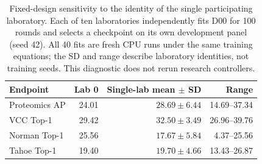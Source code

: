 \begin{table}[t]
\centering
\small
\caption{Fixed-design sensitivity to the identity of the single participating laboratory. Each of ten laboratories independently fits D00 for 100 rounds and selects a checkpoint on its own development panel (seed 42). All 40 fits are fresh CPU runs under the same training equations; the SD and range describe laboratory identities, not training seeds. This diagnostic does not rerun research controllers.}
\label{tab:fbhk-lab-identity}
\begin{tabular}{lrrr}
\toprule
Endpoint & Lab 0 & Single-lab mean $\pm$ SD & Range \\
\midrule
Proteomics AP & 24.01 & $28.69 \pm 6.44$ & 14.69--37.34 \\
VCC Top-1 & 29.42 & $32.50 \pm 3.49$ & 26.96--39.76 \\
Norman Top-1 & 25.56 & $17.67 \pm 5.84$ & 4.37--25.56 \\
Tahoe Top-1 & 19.40 & $19.70 \pm 4.66$ & 13.43--26.87 \\
\bottomrule
\end{tabular}
\end{table}
